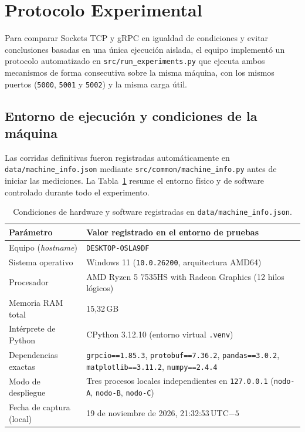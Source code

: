 \section{Protocolo Experimental}
\label{sec:protocolo_experimental}

Para comparar Sockets TCP y gRPC en igualdad de condiciones y evitar conclusiones basadas en una única ejecución aislada, el equipo implementó un protocolo automatizado en \texttt{src/run\_experiments.py} que ejecuta ambos mecanismos de forma consecutiva sobre la misma máquina, con los mismos puertos (\texttt{5000}, \texttt{5001} y \texttt{5002}) y la misma carga útil.

\subsection{Entorno de ejecución y condiciones de la máquina}

Las corridas definitivas fueron registradas automáticamente en \texttt{data/machine\_info.json} mediante \texttt{src/common/machine\_info.py} antes de iniciar las mediciones. La Tabla~\ref{tab:hardware_entorno} resume el entorno físico y de software controlado durante todo el experimento.

\begin{table}[htbp]
\centering
\caption{Condiciones de hardware y software registradas en \texttt{data/machine\_info.json}.}
\label{tab:hardware_entorno}
\small
\begin{tabular}{lp{10.2cm}}
\toprule
Parámetro & Valor registrado en el entorno de pruebas \\
\midrule
Equipo (\emph{hostname}) & \texttt{DESKTOP-OSLA9DF} \\
Sistema operativo & Windows 11 (\texttt{10.0.26200}, arquitectura AMD64) \\
Procesador & AMD Ryzen 5 7535HS with Radeon Graphics (12 hilos lógicos) \\
Memoria RAM total & 15,32\,GB \\
Intérprete de Python & CPython 3.12.10 (entorno virtual \texttt{.venv}) \\
Dependencias exactas & \texttt{grpcio==1.85.3}, \texttt{protobuf==7.36.2}, \texttt{pandas==3.0.2}, \texttt{matplotlib==3.11.2}, \texttt{numpy==2.4.4} \\
Modo de despliegue & Tres procesos locales independientes en \texttt{127.0.0.1} (\texttt{nodo-A}, \texttt{nodo-B}, \texttt{nodo-C}) \\
Fecha de captura (local) & 19 de noviembre de 2026, 21:32:53\,UTC$-5$ \\
\bottomrule
\end{tabular}
\end{table}

